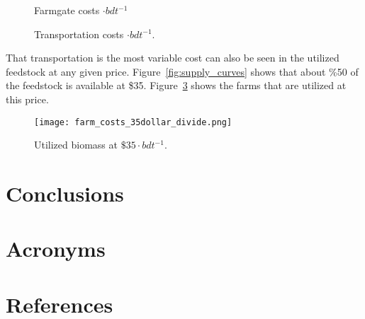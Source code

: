 \documentclass[review,3p,authoryear,times]{elsarticle}
\begin{document}
\begin{figure}[hpt]
  \centering
  \caption{Farmgate costs $\cdot bdt^{-1}$ }
  \label{fig:farmgate_hist}
\end{figure}

\begin{figure}[hpt]
  \centering
  \caption{Transportation costs $\cdot bdt^{-1}$.}
  \label{fig:transportation_hist}
\end{figure}

That transportation is the most variable cost can also be seen in the
utilized feedstock at any given price.  Figure~\ref{fig:supply_curves}
shows that about \%50 of the feedstock is available at \$35.
Figure~\ref{fig:util35} shows the farms that are utilized at this
price.

\begin{figure}[hpt]
  \centering
  \texttt{[image: farm\_costs\_35dollar\_divide.png]}  
  \caption{Utilized biomass at $\$35 \cdot bdt^{-1}$. }
  \label{fig:util35}
\end{figure}

\section{Conclusions}
\label{sec:A1conclusions}

\section*{Acronyms}
\begin{acronym}
\end{acronym}

\section{References}
\label{sec:ref}




\end{document}

